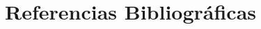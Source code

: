 \documentclass[12pt]{article}
\begin{document}


\newpage
%


\tableofcontents
\newpage

% 

% 


\newpage


\newpage

%

%

%

%

%

%

\section{Referencias Bibliográficas}

%


\newpage

\end{document}

